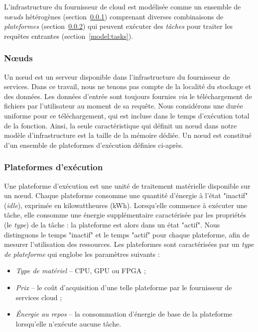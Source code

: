 L'infrastructure du fournisseur de cloud est modélisée comme un ensemble de \textit{nœuds} hétérogènes (section~\ref{model:nodes}) comprenant diverses combinaisons de \textit{plateformes} (section~\ref{model:platforms}) qui peuvent exécuter des \textit{tâches} pour traiter les requêtes entrantes (section~\ref{model:tasks}).

\subsubsection{Nœuds}
\label{model:nodes}

Un nœud est un serveur disponible dans l'infrastructure du fournisseur de services. Dans ce travail, nous ne tenons pas compte de la localité du stockage et des données. Les données d'entrée sont toujours fournies \textit{via} le téléchargement de fichiers par l'utilisateur au moment de sa requête. Nous considérons une durée uniforme pour ce téléchargement, qui est incluse dans le temps d'exécution total de la fonction. Ainsi, la seule caractéristique qui définit un nœud dans notre modèle d'infrastructure est la taille de la mémoire dédiée. Un nœud est constitué d'un ensemble de plateformes d'exécution définies ci-après.

\subsubsection{Plateformes d'exécution}
\label{model:platforms}

Une plateforme d'exécution est une unité de traitement matérielle disponible sur un nœud. Chaque plateforme consomme une quantité d'énergie à l'état "inactif" (\textit{idle}), exprimée en kilowattheures (kWh). Lorsqu'elle commence à exécuter une tâche, elle consomme une énergie supplémentaire caractérisée par les propriétés (le \textit{type}) de la tâche : la plateforme est alors dans un état "actif". Nous distinguons le temps "inactif" et le temps "actif" pour chaque plateforme, afin de mesurer l'utilisation des ressources. Les plateformes sont caractérisées par un \textit{type de plateforme} qui englobe les paramètres suivants :

\begin{itemize}
    \item \textit{Type de matériel} -- CPU, GPU ou FPGA ;
    \item \textit{Prix} -- le coût d'acquisition d'une telle plateforme par le fournisseur de services cloud ;
    \item \textit{Énergie au repos} -- la consommation d'énergie de base de la plateforme lorsqu'elle n'exécute aucune tâche.
\end{itemize}

